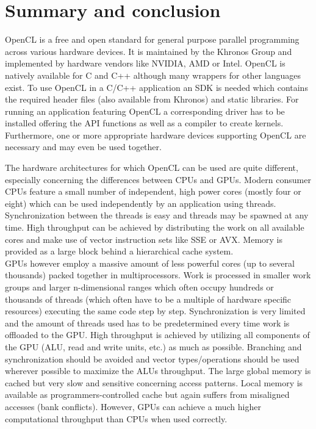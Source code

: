 \section{Summary and conclusion}

OpenCL is a free and open standard for general purpose parallel programming across various hardware devices. It is maintained by the Khronos Group and implemented by hardware vendors like NVIDIA, AMD or Intel. OpenCL is natively available for C and C++ although many wrappers for other languages exist. To use OpenCL in a C/C++ application an SDK is needed which contains the required header files (also available from Khronos) and static libraries. For running an application featuring OpenCL a corresponding driver has to be installed offering the API functions as well as a compiler to create kernels. Furthermore, one or more appropriate hardware devices supporting OpenCL are necessary and may even be used together.

The hardware architectures for which OpenCL can be used are quite different, especially concerning the differences between CPUs and GPUs.
Modern consumer CPUs feature a small number of independent, high power cores (mostly four or eight) which can be used independently by an application using threads. Synchronization between the threads is easy and threads may be spawned at any time. High throughput can be achieved by distributing the work on all available cores and make use of vector instruction sets like SSE or AVX. Memory is provided as a large block behind a hierarchical cache system. \\
GPUs however employ a massive amount of less powerful cores (up to several thousands) packed together in multiprocessors. Work is processed in smaller work groups and larger n-dimensional ranges which often occupy hundreds or thousands of threads (which often have to be a multiple of hardware specific resources) executing the same code step by step. Synchronization is very limited and the amount of threads used has to be predetermined every time work is offloaded to the GPU. High throughput is achieved by utilizing all components of the GPU (ALU, read and write units, etc.) as much as possible. Branching and synchronization should be avoided and vector types/operations should be used wherever possible to maximize the ALUs throughput. The large global memory is cached but very slow and sensitive concerning access patterns. Local memory is available as programmers-controlled cache but again suffers from misaligned accesses (bank conflicts). However, GPUs can achieve a much higher computational throughput than CPUs when used correctly.

